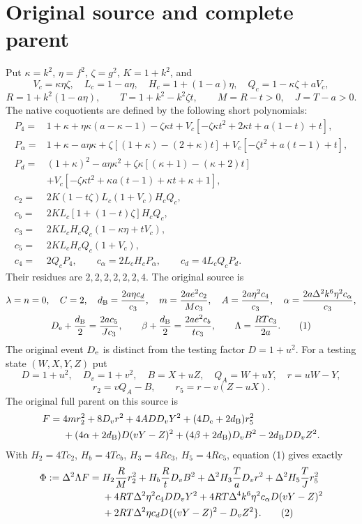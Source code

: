 \section{Original source and complete parent}

Put $\kappa=k^2$, $\eta=f^2$, $\zeta=g^2$, $K=1+k^2$, and
\[
 V_c=\kappa\eta\zeta,\quad L_c=1-a\eta,\quad
 H_c=1+(1-a)\eta,\quad Q_c=1-\kappa\zeta+aV_c,
\]
\[
 R=1+k^2(1-a\eta),\qquad T=1+k^2-k^2\zeta t,
 \qquad M=R-t>0,\quad J=T-a>0.
\]
The native coquotients are defined by the following short polynomials:
\begin{align*}
 P_4={}&1+\kappa+\eta\kappa(a-\kappa-1)-\zeta\kappa t
 +V_c[-\zeta\kappa t^2+2\kappa t+a(1-t)+t],\\
 P_\alpha={}&1+\kappa-a\eta\kappa
 +\zeta[(1+\kappa)-(2+\kappa)t]
 +V_c[-\zeta t^2+a(t-1)+t],\\
 P_d={}&(1+\kappa)^2-a\eta\kappa^2
 +\zeta\kappa[(\kappa+1)-(\kappa+2)t]\\
 &+V_c[-\zeta\kappa t^2+\kappa a(t-1)+\kappa t+\kappa+1],\\
 c_2={}&2K(1-t\zeta)L_c(1+V_c)H_cQ_c,\\
 c_b={}&2KL_c[1+(1-t)\zeta]H_cQ_c,\\
 c_3={}&2KL_cH_cQ_c(1-\kappa\eta+tV_c),\\
 c_5={}&2KL_cH_cQ_c(1+V_c),\\
 c_4={}&2Q_cP_4,\qquad c_\alpha=2L_cH_cP_\alpha,
 \qquad c_d=4L_cQ_cP_d.
\end{align*}
Their residues are $2,2,2,2,2,2,4$. The original source is
\begin{gather}
 \lambda=n=0,\quad C=2,\quad
 d_{\rm B}=\frac{2a\eta c_d}{c_3},\quad
 m=\frac{2ae^2c_2}{Mc_3},\quad
 A=\frac{2a\eta^2c_4}{c_3},\quad
 \alpha=\frac{2a\Delta^2k^6\eta^2c_\alpha}{c_3},\notag\\
 D_{\rm e}+\frac{d_{\rm B}}2=\frac{2ac_5}{Jc_3},\qquad
 \beta+\frac{d_{\rm B}}2=\frac{2ae^2c_b}{tc_3},\qquad
 \Lambda=\frac{RTc_3}{2a}.                                      \tag{1}
\end{gather}
The original event $D_{\rm e}$ is distinct from the testing factor
$D=1+u^2$. For a testing state $(W,X,Y,Z)$ put
\[
 D=1+u^2,\quad D_v=1+v^2,\quad B=X+uZ,\quad Q_A=W+uY,
 \quad r=uW-Y,
\]
\[
 r_2=vQ_A-B,\qquad r_5=r-v(Z-uX).
\]
The original full parent on this source is
\begin{align*}
 F={}&4mr_2^2+8D_vr^2+4ADD_vY^2+(4D_{\rm e}+2d_{\rm B})r_5^2\\
 &+(4\alpha+2d_{\rm B})D(vY-Z)^2
 +(4\beta+2d_{\rm B})D_vB^2-2d_{\rm B}DD_vZ^2.
\end{align*}
With $H_2=4Tc_2$, $H_b=4Tc_b$, $H_3=4Rc_3$, $H_5=4Rc_5$,
equation (1) gives exactly
\begin{align}
 \Phi:=\Delta^2\Lambda F={}&H_2\frac RM r_2^2
 +H_b\frac RtD_vB^2+\Delta^2H_3\frac TaD_vr^2
 +\Delta^2H_5\frac TJr_5^2\notag\\
 &+4RT\Delta^2\eta^2c_4DD_vY^2
 +4RT\Delta^4k^6\eta^2c_\alpha D(vY-Z)^2\notag\\
 &+2RT\Delta^2\eta c_dD\{(vY-Z)^2-D_vZ^2\}.             \tag{2}
\end{align}

